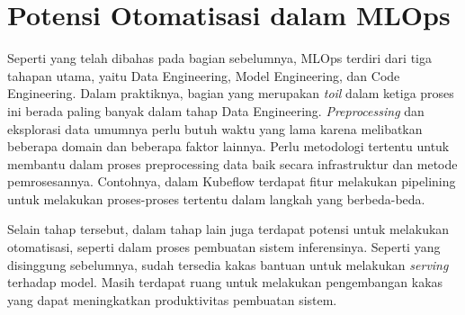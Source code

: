 \section{Potensi Otomatisasi dalam MLOps}

Seperti yang telah dibahas pada bagian sebelumnya, MLOps terdiri dari tiga tahapan utama, yaitu Data Engineering, Model Engineering, dan Code Engineering.
Dalam praktiknya, bagian yang merupakan \textit{toil} dalam ketiga proses ini berada paling banyak dalam tahap Data Engineering.
\textit{Preprocessing} dan eksplorasi data umumnya perlu butuh waktu yang lama karena melibatkan beberapa domain dan beberapa faktor lainnya.
Perlu metodologi tertentu untuk membantu dalam proses preprocessing data baik secara infrastruktur dan metode pemrosesannya.
Contohnya, dalam Kubeflow terdapat fitur melakukan pipelining untuk melakukan proses-proses tertentu dalam langkah yang berbeda-beda.

Selain tahap tersebut, dalam tahap lain juga terdapat potensi untuk melakukan otomatisasi, seperti dalam proses pembuatan sistem inferensinya.
Seperti yang disinggung sebelumnya, sudah tersedia kakas bantuan untuk melakukan \textit{serving} terhadap model.
Masih terdapat ruang untuk melakukan pengembangan kakas yang dapat meningkatkan produktivitas pembuatan sistem.
